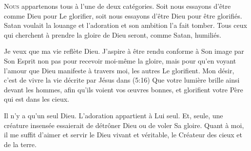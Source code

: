 


\lettrine{N}{ous} appartenons tous à l'une de deux catégories.
 Soit nous essayons d'être comme Dieu pour Le glorifier,
 soit nous essayons d'être Dieu pour être glorifiés.
 Satan voulait la louange et l'adoration
 \ocadr et son ambition l'a fait tomber.
 Tous ceux qui cherchent à prendre la gloire de Dieu seront,
 comme Satan, humiliés. 


Je veux que ma vie reflète Dieu. J'aspire à être rendu conforme
 à Son image par Son Esprit \ocadr non pas pour recevoir moi-même la gloire,
 mais pour qu'en voyant l'amour que Dieu manifeste à travers moi,
 les autres Le glorifient.
 Mon désir, c'est de vivre la vie décrite par Jésus
 dans (5:16)\frcolon{}
 \Og Que votre lumière brille ainsi devant les hommes,
 afin qu'ils voient vos \oe{}uvres bonnes,
 et glorifient votre Père qui est dans les cieux. \Fg{}

Il n'y a qu'un seul Dieu. L'adoration appartient à Lui seul.
 Et, seule, 
 une créature insensée essaierait de détrôner Dieu ou de voler Sa gloire.
 Quant à moi, il me suffit d'aimer et servir le Dieu vivant et véritable,
 le Créateur des cieux et de la terre. 

\dvrule






